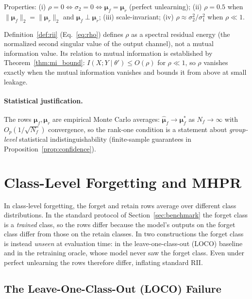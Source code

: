 \documentclass[smallextended]{svjour3}       %
\begin{document}
Properties: (i) $\rho = 0 \iff \sigma_2 = 0 \iff \boldsymbol{\mu}_f = \boldsymbol{\mu}_r$ (perfect unlearning); (ii) $\rho = 0.5$ when $\|\boldsymbol{\mu}_f\|_2=\|\boldsymbol{\mu}_r\|_2$ and $\boldsymbol{\mu}_f \perp \boldsymbol{\mu}_r$; (iii) scale-invariant; (iv) $\rho \approx \sigma_2^2/\sigma_1^2$ when $\rho \ll 1$.

Definition~\ref{def:rii} (Eq.~\eqref{eq:rho}) defines $\rho$ as a spectral residual energy (the normalized second singular value of the output channel), not a mutual information value. Its relation to mutual information is established by Theorem~\ref{thm:mi_bound}: $I(X;Y\mid\theta')\le O(\rho)$ for $\rho\ll1$, so $\rho$ vanishes exactly when the mutual information vanishes and bounds it from above at small leakage.

\paragraph{Statistical justification.}
The rows $\boldsymbol{\mu}_f, \boldsymbol{\mu}_r$ are empirical Monte Carlo averages: $\hat{\boldsymbol{\mu}}_f\to\boldsymbol{\mu}_f^*$ as $N_f\to\infty$ with $O_p(1/\sqrt{N_f})$ convergence, so the rank-one condition is a statement about \emph{group-level} statistical indistinguishability (finite-sample guarantees in Proposition~\ref{prop:confidence}).

\section{Class-Level Forgetting and MHPR}
\label{sec:class_baselines}

In class-level forgetting, the forget and retain rows average over different class distributions. In the standard protocol of Section~\ref{sec:benchmark} the forget class is a \emph{trained} class, so the rows differ because the model's outputs on the forget class differ from those on the retain classes. In two constructions the forget class is instead \emph{unseen} at evaluation time: in the leave-one-class-out (LOCO) baseline and in the retraining oracle, whose model never saw the forget class. Even under perfect unlearning the rows therefore differ, inflating standard RII.

\subsection{The Leave-One-Class-Out (LOCO) Failure}
\end{document}
